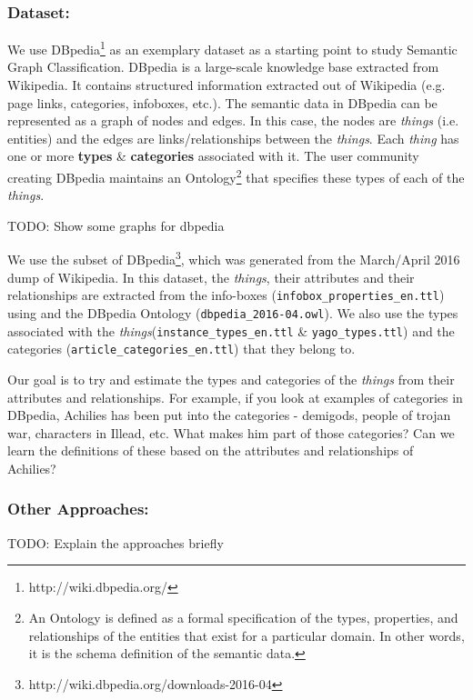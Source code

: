 \documentclass[runningheads,a4paper]{llncs}
\begin{document}
\subsubsection{Dataset:}
\label{dataset}
We use DBpedia\footnote{http://wiki.dbpedia.org/} as an exemplary dataset 
as a starting point to study Semantic Graph Classification. DBpedia is a 
large-scale knowledge base extracted from Wikipedia\cite{lehmann2015dbpedia}. 
It contains structured information extracted 
out of Wikipedia (e.g. page links, categories, infoboxes, etc.)\cite{dbpedia-swj}.
The semantic data in DBpedia can be represented as a graph of nodes and edges.
In this case, the nodes are \textit{things} (i.e. entities) and the edges are links/relationships between the
\textit{things}. Each \textit{thing} has one or more \textbf{types} \& \textbf{categories} associated with it.
The user community creating DBpedia maintains an Ontology\footnote{An Ontology is defined as a formal specification of the types, properties, and relationships of the entities that exist for a particular domain. In other words, it is the schema definition of the semantic data.} that specifies these types
of each of the \textit{things}. 

{\color{red} TODO: Show some graphs for dbpedia}

We use the subset of DBpedia\footnote{http://wiki.dbpedia.org/downloads-2016-04}, which was generated from the March/April 2016 dump of Wikipedia. In this dataset, the \textit{things}, their attributes and 
their relationships are extracted from the info-boxes (\texttt{infobox\_properties\_en.ttl}) using and the DBpedia Ontology (\texttt{dbpedia\_2016-04.owl}). We also use the types associated with the \textit{things}(\texttt{instance\_types\_en.ttl} \& \texttt{yago\_types.ttl}) and the categories (\texttt{article\_categories\_en.ttl}) that they belong to.

Our goal is to try and estimate the types and categories of the \textit{things} from their attributes and relationships. 
For example, if you look at examples of categories in DBpedia, Achilies has been
put into the categories - demigods, people of trojan war, characters in Illead, etc.
What makes him part of those categories? Can we learn the definitions of these
based on the attributes and relationships of Achilies? 

\subsubsection{Other Approaches:}
{\color{red} TODO: Explain the approaches briefly}
\end{document}
